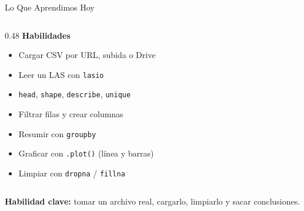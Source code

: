 \documentclass[aspectratio=169, 11pt]{beamer}
\begin{document}
\begin{frame}{Lo Que Aprendimos Hoy}
\begin{columns}[T]
    \begin{column}{0.48\textwidth}
      {\footnotesize\color{arcaDark}\bfseries Habilidades}
      \vspace{3pt}
      {\footnotesize\color{textMuted}
      \begin{itemize}\setlength{\itemsep}{2pt}
        \item[{\color{codeGreen}\scriptsize\faCheck}]
          Cargar CSV por URL, subida o Drive
        \item[{\color{codeGreen}\scriptsize\faCheck}]
          Leer un LAS con \texttt{lasio}
        \item[{\color{codeGreen}\scriptsize\faCheck}]
          \texttt{head}, \texttt{shape}, \texttt{describe}, \texttt{unique}
        \item[{\color{codeGreen}\scriptsize\faCheck}]
          Filtrar filas y crear columnas
        \item[{\color{codeGreen}\scriptsize\faCheck}]
          Resumir con \texttt{groupby}
        \item[{\color{codeGreen}\scriptsize\faCheck}]
          Graficar con \texttt{.plot()} (línea y barras)
        \item[{\color{codeGreen}\scriptsize\faCheck}]
          Limpiar con \texttt{dropna} / \texttt{fillna}
      \end{itemize}
      }
    \end{column}
  \end{columns}

  \vspace{6pt}
  \centering
  {\footnotesize\color{arcaDark}
    \textbf{Habilidad clave:} tomar un archivo real, cargarlo, limpiarlo y sacar conclusiones.}
\end{frame}
\end{document}
